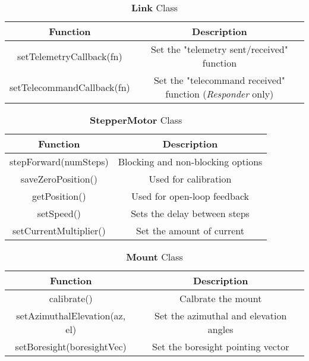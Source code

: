 \begin{table}[!htb]
  \centering
  \caption{\textbf{Link} Class}
  \renewcommand{\arraystretch}{1.2}
  \begin{tabular}{ |c|c| }
  \hline
  \textbf{Function}        & \textbf{Description}    \\
  \hline
  setTelemetryCallback(fn)                    & Set the "telemetry sent/received" function  \\
  setTelecommandCallback(fn)                  & Set the "telecommand received" function (\textit{Responder} only) \\
  \hline
  \end{tabular}
  \label{tab:linkUML}
\end{table}

\begin{table}[!htb]
  \centering
  \caption{\textbf{StepperMotor} Class}
  \renewcommand{\arraystretch}{1.2}
  \begin{tabular}{ |c|c| }
  \hline
  \textbf{Function}        & \textbf{Description}    \\
  \hline
    stepForward(numSteps)         & Blocking and non-blocking options \\
    saveZeroPosition()            & Used for calibration \\
    getPosition()                 & Used for open-loop feedback \\
    setSpeed()                    & Sets the delay between steps \\
    setCurrentMultiplier()        & Set the amount of current \\
  \hline
  \end{tabular}
  \label{tab:stepperMotorUML}
\end{table}

\begin{table}[!htb]
  \centering
  \caption{\textbf{Mount} Class}
  \renewcommand{\arraystretch}{1.2}
  \begin{tabular}{ |c|c| }
  \hline
  \textbf{Function}        & \textbf{Description}    \\
  \hline
    calibrate()                         & Calbrate the mount \\
    setAzimuthalElevation(az, el)       & Set the azimuthal and elevation angles \\
    setBoresight(boresightVec)          & Set the boresight pointing vector \\
  \hline
  \end{tabular}
  \label{tab:mountUML}
\end{table}


